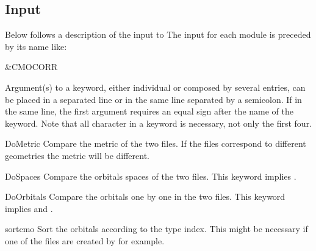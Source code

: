 \subsection{Input}
\label{UG:sec:cmocorr_input}
Below follows a description of the input to 
The input for each module is preceded by its name like:
\begin{inputlisting}
 &CMOCORR
\end{inputlisting}
Argument(s) to a keyword, either individual or composed by several entries, 
can be placed in a separated line or in the same line separated by a semicolon.
If in the same line, the first argument requires an equal sign after the
name of the keyword. Note that all character in a keyword is necessary,
not only the first four.
\begin{keywordlist}
\item[DoMetric]
Compare the metric of the two files.
If the files correspond to different geometries the metric will be different.
\item[DoSpaces]
Compare the orbitals spaces of the two files.
This keyword implies .
\item[DoOrbitals]
Compare the orbitals one by one in the two files.
This keyword implies  and .
\item[sortcmo]
Sort the orbitals according to the type index.
This might be necessary if one of the files are created by  for example.

\end{keywordlist}
